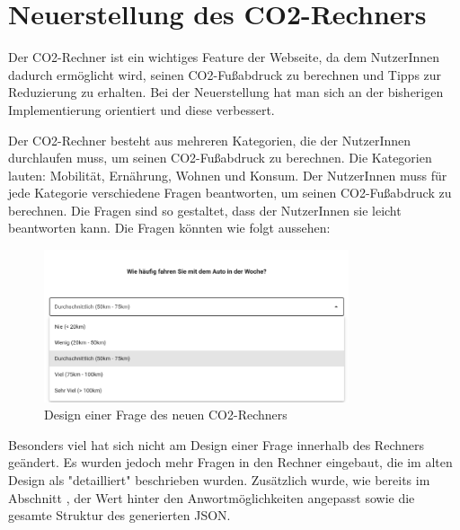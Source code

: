 \section{Neuerstellung des CO2-Rechners}
\label{chapter:neuerstellung_co2rechner}


Der CO2-Rechner ist ein wichtiges Feature der Webseite, da dem NutzerInnen dadurch ermöglicht wird, seinen CO2-Fußabdruck zu berechnen und Tipps zur Reduzierung zu erhalten.
Bei der Neuerstellung hat man sich an der bisherigen Implementierung orientiert und diese verbessert.

Der CO2-Rechner besteht aus mehreren Kategorien, die der NutzerInnen durchlaufen muss, um seinen CO2-Fußabdruck zu berechnen.
Die Kategorien lauten: Mobilität, Ernährung, Wohnen und Konsum.
Der NutzerInnen muss für jede Kategorie verschiedene Fragen beantworten, um seinen CO2-Fußabdruck zu berechnen.
Die Fragen sind so gestaltet, dass der NutzerInnen sie leicht beantworten kann.
Die Fragen könnten wie folgt aussehen:

\begin{figure}[H]
    \centering
    \includegraphics[width=0.8\textwidth]{images/06/Question_New_Design.png}
    \caption{Design einer Frage des neuen CO2-Rechners}
    \label{fig:new-co2runter-question-design}
\end{figure}

Besonders viel hat sich nicht am Design einer Frage innerhalb des Rechners geändert.
Es wurden jedoch mehr Fragen in den Rechner eingebaut, die im alten Design als "detailliert" beschrieben wurden.
Zusätzlich wurde, wie bereits im Abschnitt %
, der Wert hinter den Anwortmöglichkeiten angepasst sowie die gesamte Struktur des generierten \acs{JSON}.

